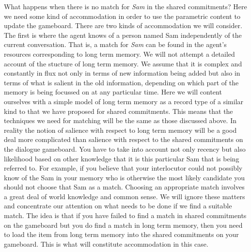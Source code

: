 What happens when there is no match for \textit{Sam} in the shared
commitments?  Here we need some kind of accommodation in order to use
the parametric content to update the gameboard.  There are two kinds
of accommodation we will consider.  The first is where the agent knows
of a person named Sam independently of the current conversation.  That
is, a match for \textit{Sam} can be found in the agent's resources
corresponding to long term memory.  We will not attempt a detailed
account of the stucture of long term memory.  We assume that it is
complex and constantly in flux not only in terms of new information
being added but also in terms of what is salient in the old
information, depending on which part of the memory is being focussed
on at any particular time.  Here we will content ourselves with a
simple model of long term memory as a record type of a similar kind to
that we have proposed for shared commitments.  This means that the
techniques we need for matching will be the same as those discussed
above.  In reality the notion of salience with respect to long term
memory will be a good deal more complicated than salience with respect
to the shared commitments on the dialogue gameboard.  You have to take
into account not only recency but also likelihood based on other
knowledge that it is this particular Sam that is being referred to.
For example, if you believe that your interlocutor could not possibly
know of the Sam in your memory who is otherwise the most likely
candidate you should not choose that Sam as a match.  Choosing an
appropriate match involves a great deal of world knowledge and common
sense.  We will ignore these matters and concentrate our attention on
what needs to be done if we find a suitable match.  The idea is that
if you have failed to find a match in shared commitments on the
gameboard but you do find a match in long term memory, then you need
to load the item from long term memory into the shared commitments on
your gameboard.  This is what will constitute accommodation in this
case.

